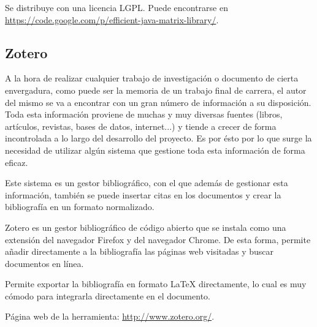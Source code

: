 Se distribuye con una licencia LGPL. Puede encontrarse en \url{https://code.google.com/p/efficient-java-matrix-library/}.

\subsection{Zotero}
A la hora de realizar cualquier trabajo de investigación o documento de cierta envergadura, como puede ser la memoria de un trabajo final de carrera, el autor del mismo se va a encontrar con un gran número de información a su disposición. Toda esta información proviene de muchas y muy diversas fuentes (libros, artículos, revistas, bases de datos, internet...) y tiende a crecer de forma incontrolada a lo largo del desarrollo del proyecto. Es por ésto por lo que surge la necesidad de utilizar algún sistema que gestione toda esta información de forma eficaz.

Este sistema es un gestor bibliográfico, con el que además de gestionar esta información, también se puede insertar citas en los documentos y crear la bibliografía en un formato normalizado.

Zotero es un gestor bibliográfico de código abierto que se instala como una extensión del navegador Firefox y del navegador Chrome. De esta forma, permite añadir directamente a la bibliografía las páginas web visitadas y buscar documentos en línea.

Permite exportar la bibliografía en formato \LaTeX{} directamente, lo cual es muy cómodo para integrarla directamente en el documento.

Página web de la herramienta: \url{http://www.zotero.org/}.


